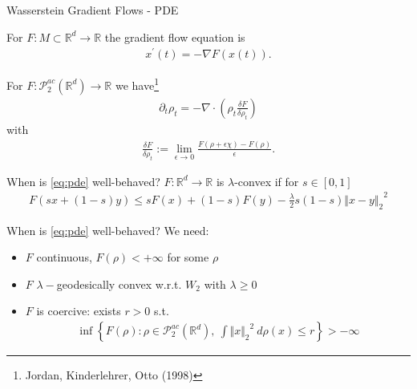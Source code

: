 \documentclass[aspectratio=149]{beamer}
\def\real{\mathbb{R}}
\newcommand{\norm}[2]{\ensuremath{\Vert #1 \Vert_{#2}}}
\newcommand{\variation}[1]{\ensuremath{\frac{\delta F}{\delta #1}}}
\begin{document}
\begin{frame}{Wasserstein Gradient Flows - PDE}

For $F:M\subset \real^d\rightarrow \real$ the gradient flow equation is
\begin{align*}
x^\prime(t)=-\nabla F(x(t)).
\end{align*}

For $F:\mathcal{P}_{2}^{ac}(\real^{d})\rightarrow \real$
we have\footnote{Jordan, Kinderlehrer, Otto (1998)}
\begin{align}
\label{eq:pde}
\partial_{t}\rho_{t}=-\nabla\cdot\left(\rho_{t}\variation{\rho_t}\right)
\end{align}
with
\begin{align*}
\variation{\rho_t}:=\lim_{\epsilon\rightarrow0}\frac{F(\rho+\epsilon\chi) - F(\rho)}{ \epsilon}.
\end{align*}
\end{frame}

\begin{frame}{When is \eqref{eq:pde} well-behaved?}
$F:\real^d\rightarrow \real$ is $\lambda$-convex if for $s\in[0, 1]$
\begin{align*}
F(sx+(1-s)y)\leq sF(x)+(1-s)F(y)-\frac {\lambda}{2}s(1-s)\norm{x-y}{2}^{2}
\end{align*}

\begin{figure}
\centering
{}
\end{figure}
\end{frame}


\begin{frame}{When is \eqref{eq:pde} well-behaved?}
We need:
\begin{itemize}
\item $F$ continuous, $F(\rho)<+\infty$ for some $\rho$
\item $F$ $\lambda-$geodesically convex w.r.t. $W_2$ with $\lambda\geq0$
\item $F$ is coercive: exists $r>0$ s.t.
\begin{align*}
\inf\left\lbrace F(\rho): \rho\in\mathcal{P}_{2}^{ac}(\real^{d}), \ \int\norm{x}{2}^{2}\ d\rho(x)\leq r\right\rbrace>-\infty
\end{align*}
\end{itemize}
\end{frame}
\end{document}
